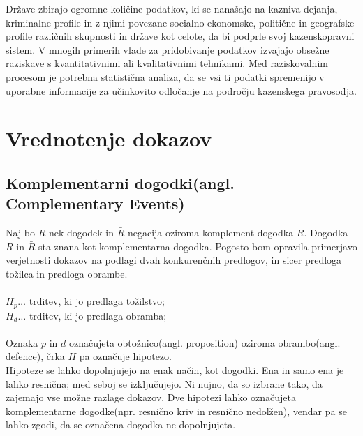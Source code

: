 \documentclass[12pt,a4paper]{amsart}
\theoremstyle{definition} %
\theoremstyle{plain} %
\begin{document}
Države zbirajo ogromne količine podatkov, ki se nanašajo na kazniva dejanja, kriminalne profile in z njimi povezane socialno-ekonomske, politične in 
geografske profile različnih skupnosti in države kot celote, da bi podprle svoj kazenskopravni sistem. V mnogih primerih vlade za pridobivanje 
podatkov izvajajo obsežne raziskave s kvantitativnimi ali kvalitativnimi tehnikami. Med raziskovalnim procesom je potrebna statistična analiza, da 
se vsi ti podatki spremenijo v uporabne informacije za učinkovito odločanje na področju kazenskega pravosodja.

\section{Vrednotenje dokazov}

\subsection{Komplementarni dogodki(angl. Complementary Events)}
Naj bo $R$ nek dogodek in $\bar{R}$ negacija oziroma komplement dogodka $R$. Dogodka $R$ in $\bar{R}$ sta znana kot komplementarna dogodka. Pogosto 
bom opravila primerjavo verjetnosti dokazov na podlagi dvah konkurenčnih predlogov, in sicer predloga tožilca in predloga obrambe. \\ \\
$H_p \dots$ trditev, ki jo predlaga tožilstvo;\\
$H_d \dots$ trditev, ki jo predlaga obramba;\\ \\
Oznaka $p$ in $d$ označujeta obtožnico(angl. proposition) oziroma obrambo(angl. defence), črka $H$ pa označuje hipotezo.\\
Hipoteze se lahko dopolnjujejo na enak način, kot dogodki. Ena in samo ena je lahko resnična; med seboj se izključujejo. Ni nujno, da so izbrane tako, 
da zajemajo vse možne razlage dokazov. Dve hipotezi lahko označujeta komplementarne dogodke(npr. resnično kriv in resnično nedolžen), vendar pa se lahko zgodi, 
da se označena dogodka ne dopolnjujeta. 
\end{document}
